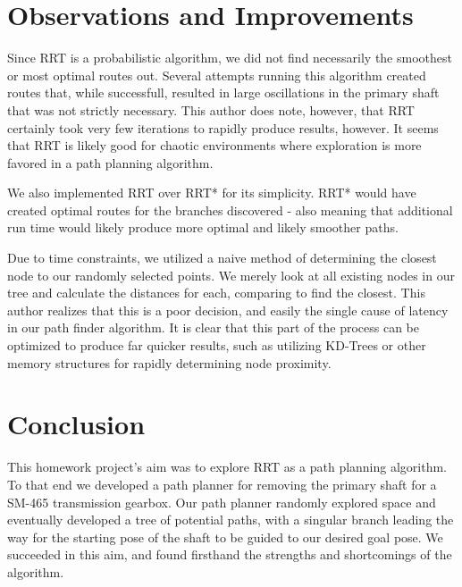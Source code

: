 \documentclass{article}
\begin{document}
\section*{Observations and Improvements}

Since RRT is a probabilistic algorithm, we did not find necessarily the smoothest or most optimal routes out. Several attempts running this algorithm created routes that, while successfull, resulted in large oscillations in the primary shaft that was not strictly necessary. This author does note, however, that RRT certainly took very few iterations to rapidly produce results, however. It seems that RRT is likely good for chaotic environments where exploration is more favored in a path planning algorithm.

We also implemented RRT over RRT* for its simplicity. RRT* would have created optimal routes for the branches discovered - also meaning that additional run time would likely produce more optimal and likely smoother paths.

Due to time constraints, we utilized a naive method of determining the closest node to our randomly selected points. We merely look at all existing nodes in our tree and calculate the distances for each, comparing to find the closest. This author realizes that this is a poor decision, and easily the single cause of latency in our path finder algorithm. It is clear that this part of the process can be optimized to produce far quicker results, such as utilizing KD-Trees or other memory structures for rapidly determining node proximity.

\section*{Conclusion}

This homework project's aim was to explore RRT as a path planning algorithm. To that end we developed a path planner for removing the primary shaft for a SM-465 transmission gearbox. Our path planner randomly explored space and eventually developed a tree of potential paths, with a singular branch leading the way for the starting pose of the shaft to be guided to our desired goal pose. We succeeded in this aim, and found firsthand the strengths and shortcomings of the algorithm.
\end{document}
